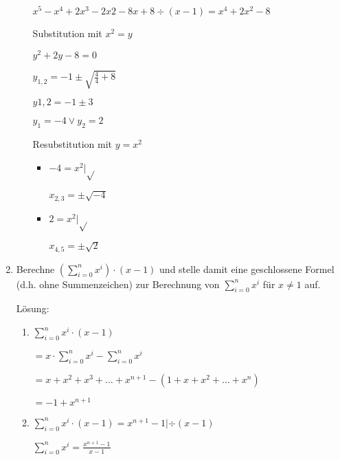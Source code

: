 \documentclass[../main.tex]{subfiles}
\begin{document}
\begin{enumerate}
\begin{enumerate}
		            \(  x^5 - x^4 + 2x^3 -2x2 -8x +8 \div (x - 1) =  x^4 + 2x^2 - 8 \)

		            Substitution mit \( x^2 = y \)

		            \( y^2 + 2y - 8 = 0 \)

		            \( y_{1,2} = -1 \pm \sqrt{ \frac{4}{4} + 8} \)

		            \( y{1,2} = -1 \pm 3 \)

		            \(  y_1 = -4 \lor y_2 = 2 \)

		            Resubstitution mit \( y = x^2 \)
		            \begin{multicols}{2}
			            \begin{itemize}
				            \item[] \( -4 = x^2  | \sqrt{} \)

				                  \( x_{2,3} = \pm \sqrt{-4} \)
				            \item[] \( 2 = x^2 | \sqrt{} \)

				                  \( x_{4,5} = \pm \sqrt{2} \)
			            \end{itemize}
		            \end{multicols}
	      \end{enumerate}
	\item Berechne \( (\sum_{i = 0}^{n} x^i) \cdot ( x -1) \)
	      und stelle damit eine geschlossene Formel (d.h. ohne Summenzeichen) zur Berechnung von
	      \(\sum_{ i = 0}^{n} x^i \) für \( x \neq 1 \) auf.

	      Lösung:
	      \begin{enumerate}
		      \item \( \sum_{i = 0}^{n} x^i \cdot (x - 1) \)

		            \( = x \cdot \sum_{i = 0}^{n} x^i - \sum_{i = 0}^{n} x^i \)

		            \( = x + x^2 + x^3 + \dots + x^{n+1} - (1 + x + x^2 + \dots + x^n) \)

		            \( = -1 + x^{n+1} \)

			\item \( \sum_{i = 0}^{n} x^i \cdot (x - 1) = x^{n+1} -1  | \div (x-1) \)

		            \( \sum_{i = 0}^{n} x^i = \frac{ x^{n + 1} - 1 }{ x - 1 }  \)
	      \end{enumerate}
\end{enumerate}
\end{document}
